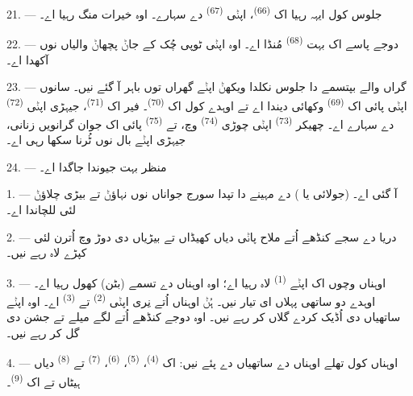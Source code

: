 \VUsaut{4.6mm}
\VUsaut{3.4mm}

21. --- جلوس کول ایہہ رہیا اک  \textsuperscript{(66)}، اپݨی
 \textsuperscript{(67)} دے سہارے۔ اوہ خیرات منگ رہیا اے۔

22. --- دوجے پاسے اک بہت  \textsuperscript{(68)} مُنڈا اے۔ اوہ
اپݨی ٹوپی چُک کے جاݨ پچھاݨ والیاں نوں  آکھدا اے۔

23. --- گراں والے بپتسمے دا جلوس نکلدا ویکھݨ اپݨے گھراں توں باہر آ گئے نیں۔
سانوں اپݨی  پائی اک  \textsuperscript{(69)}
وکھائی دیندا اے تے اوہدے کول اک  \textsuperscript{(70)}۔ فیر
اک  \textsuperscript{(71)}، جیہڑی اپݨی 
\textsuperscript{(72)} دے سہارے اے۔ چھیکر  \textsuperscript{(73)}
اپݨی چوڑی  \textsuperscript{(74)} وچ، تے 
\textsuperscript{(75)} پائی اک جوان گرانویں زنانی، جیہڑی اپݨے بال نوں ٹُرنا سکھا
رہی اے۔

24. --- منظر بہت جیوندا جاگدا اے۔
\VUsaut{4.0mm}

\VUsaut{3.0mm}

\VUsaut{2.4mm}

\VUsaut{3.0mm}

1. ---  آ گئی اے۔  (جولائی یا ) دے مہینے
دا تپدا سورج جواناں نوں نہاؤݨ تے بیڑی چلاؤݨ لئی للچاندا اے۔

2. --- دریا دے سجے کنڈھے اُتے ملاح پاݨی دیاں کھیڈاں تے بیڑیاں دی دوڑ وچ اُترن
لئی کپڑے لاہ رہے نیں۔

3. --- اوہناں وچوں اک اپݨے  \textsuperscript{(1)} لاہ رہیا اے؛ اوہ
اوہناں دے تسمے (بٹن) کھول رہیا اے۔ اوہدے دو ساتھی پہلاں ای تیار نیں۔ ہُݨ اوہناں
اُتے نِری اپݨی  \textsuperscript{(2)} تے 
\textsuperscript{(3)} اے۔ اوہ اپݨے ساتھیاں دی اُڈیک کردے گلاں کر رہے نیں۔ اوہ
دوجے کنڈھے اُتے لگے میلے تے جشن دی گل کر رہے نیں۔

4. --- اوہناں کول تھلے اوہناں دے ساتھیاں دے  پئے نیں: اک
  \textsuperscript{(4)}، 
\textsuperscript{(5)}،  \textsuperscript{(6)}، 
\textsuperscript{(7)} تے  \textsuperscript{(8)} دیاں ہیٹاں تے اک
 \textsuperscript{(9)}۔

